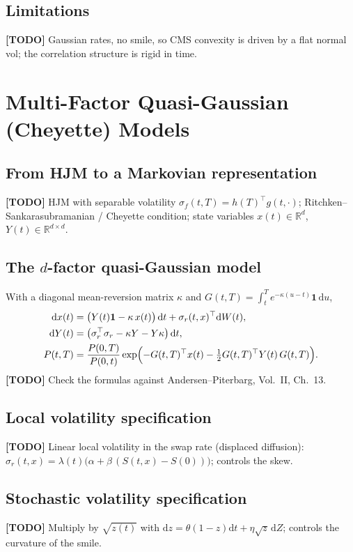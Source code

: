 \documentclass[11pt,a4paper]{article}
\theoremstyle{plain}
\theoremstyle{definition}
\newcommand{\dd}{\mathrm{d}}
\newcommand{\R}{\mathbb{R}}
\newcommand{\todo}[1]{\textcolor{red!70!black}{\textbf{[TODO]} #1}}
\begin{document}
\subsection{Limitations}
\todo{Gaussian rates, no smile, so CMS convexity is driven by a flat normal vol; the correlation structure is rigid in time.}

\clearpage
\section{Multi-Factor Quasi-Gaussian (Cheyette) Models}
\label{sec:cheyette}

\subsection{From HJM to a Markovian representation}
\todo{HJM with separable volatility $\sigma_f(t,T)=h(T)^\top g(t,\cdot)$; Ritchken--Sankarasubramanian / Cheyette condition; state variables $x(t)\in\R^d$, $Y(t)\in\R^{d\times d}$.}

\subsection{The $d$-factor quasi-Gaussian model}
With a diagonal mean-reversion matrix $\kappa$ and $G(t,T)=\int_t^T e^{-\kappa(u-t)}\mathbf{1}\,\dd u$,
\begin{align}
    \dd x(t) &= \bigl(Y(t)\mathbf{1} - \kappa\,x(t)\bigr)\,\dd t + \sigma_r(t,x)^\top \dd W(t),\\
    \dd Y(t) &= \bigl(\sigma_r^\top\sigma_r - \kappa Y - Y\kappa\bigr)\,\dd t,\\
    P(t,T) &= \frac{P(0,T)}{P(0,t)}\exp\Bigl(-G(t,T)^\top x(t) - \tfrac12 G(t,T)^\top Y(t)\,G(t,T)\Bigr).
\end{align}
\todo{Check the formulas against Andersen--Piterbarg, Vol.~II, Ch.~13.}

\subsection{Local volatility specification}
\todo{Linear local volatility in the swap rate (displaced diffusion): $\sigma_r(t,x)=\lambda(t)\bigl(\alpha + \beta\,(S(t,x)-S(0))\bigr)$; controls the skew.}

\subsection{Stochastic volatility specification}
\todo{Multiply by $\sqrt{z(t)}$ with $\dd z=\theta(1-z)\dd t+\eta\sqrt{z}\,\dd Z$; controls the curvature of the smile.}
\end{document}
